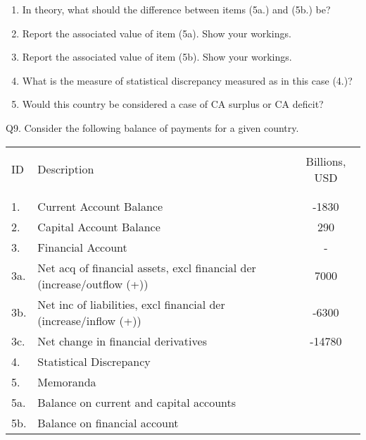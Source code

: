 \documentclass[12pt]{article}
\begin{document}
\begin{enumerate}[1)]
	\item In theory, what should the difference between items (5a.) and (5b.) be?
	
	\vspace{0.4in}
	
	\item Report the associated value of item (5a). Show your workings.
	
	\vspace{0.4in}
	\vspace{0.2in}
	
	\item Report the associated value of item (5b). Show your workings.
	
	\vspace{0.4in}
	\vspace{0.2in}
	
	\item What is the measure of statistical discrepancy measured as in this case (4.)?
	
	\vspace{0.4in}
	\vspace{0.2in}
	
	\item Would this country be considered a case of CA surplus or CA deficit?
	
	\vspace{0.4in}	
	\vspace{0.2in} 
	
\end{enumerate}

\newpage

\noindent Q9. Consider the following balance of payments for a given country.

\begin{table}[!h]
	\centering
	\begin{tabular}[t]{l l c }
		\hline
		&&\\
		ID & Description & Billions, USD \\
		&&\\
		\hline
		&&\\
		1. & Current Account Balance & -1830\\
		2. & Capital Account Balance & 290\\
		3. & Financial Account	& -\\
		3a. & Net acq of financial assets, excl financial der (increase/outflow (+))& 7000\\
		3b. & Net inc of liabilities, excl financial der (increase/inflow (+))	& -6300 \\
		3c. & Net change in financial derivatives & -14780\\
		4. & Statistical Discrepancy & \\
		5. & Memoranda & \\
		5a. & Balance on current and capital accounts & \\
		5b. & Balance on financial account & \\
		\hline
	\end{tabular}
\end{table}
\end{document}
